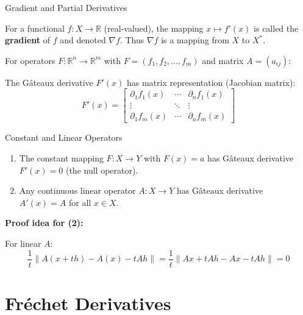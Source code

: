 \documentclass[aspectratio=169,10pt]{beamer}
\begin{document}
\begin{frame}{Gradient and Partial Derivatives}
  \begin{definition}[Gradient]
    For a functional $f: X \to \mathbb{R}$ (real-valued), the mapping $x \mapsto f'(x)$ is called the \textbf{gradient} of $f$ and denoted $\nabla f$. Thus $\nabla f$ is a mapping from $X$ to $X^*$.
  \end{definition}

  \begin{observation}
    For operators $F: \mathbb{R}^n \to \mathbb{R}^m$ with $F = (f_1, f_2, \ldots, f_m)$ and matrix $A = (a_{ij})$:

    The Gâteaux derivative $F'(x)$ has matrix representation (Jacobian matrix):
    \[
      F'(x) = \begin{bmatrix}
        \partial_1 f_1(x) & \cdots & \partial_n f_1(x) \\
        \vdots & \ddots & \vdots \\
        \partial_1 f_m(x) & \cdots & \partial_n f_m(x)
      \end{bmatrix}
    \]
  \end{observation}
\end{frame}

\begin{frame}{Constant and Linear Operators}
  \begin{lemma}
    \begin{enumerate}
      \item The constant mapping $F: X \to Y$ with $F(x) = a$ has Gâteaux derivative $F'(x) = 0$ (the null operator).

      \item Any continuous linear operator $A: X \to Y$ has Gâteaux derivative $A'(x) = A$ for all $x \in X$.
    \end{enumerate}
  \end{lemma}

  \textbf{Proof idea for (2):}

  For linear $A$:
  \[
    \frac{1}{t}\|A(x + th) - A(x) - tAh\| = \frac{1}{t}\|Ax + tAh - Ax - tAh\| = 0
  \]
\end{frame}


\section{Fréchet Derivatives}
\end{document}
